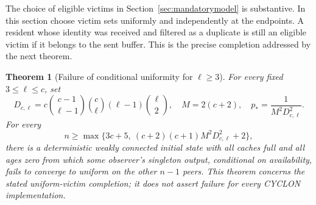 \documentclass[11pt]{article}
\newtheorem{theorem}{Theorem}
\begin{document}
The choice of eligible victims in Section~\ref{sec:mandatorymodel}
is substantive. In this section choose victim sets uniformly and
independently at the endpoints. A resident whose identity was
received and filtered as a duplicate is still an eligible victim
if it belongs to the sent buffer. This is the precise completion
addressed by the next theorem.

\begin{theorem}[Failure of conditional uniformity for $\ell\ge3$]
\label{thm:largerobstruction}
For every fixed $3\le\ell\le c$, set
\[
 D_{c,\ell}
 =c\binom{c-1}{\ell-1}\binom c\ell(\ell-1)\binom\ell2,
 \quad M=2(c+2),\quad p_*=\frac1{M^2D_{c,\ell}^2}.
\]
For every
\[
 n\ge
 \max\{3c+5,\ (c+2)(c+1)M^2D_{c,\ell}^2+2\},
\]
there is a deterministic weakly connected initial state with
all caches full and all ages zero from which some observer's
singleton output, conditional on availability, fails to converge
to uniform on the other $n-1$ peers.
This theorem concerns the stated uniform-victim completion;
it does not assert failure for every CYCLON implementation.
\end{theorem}
\end{document}

